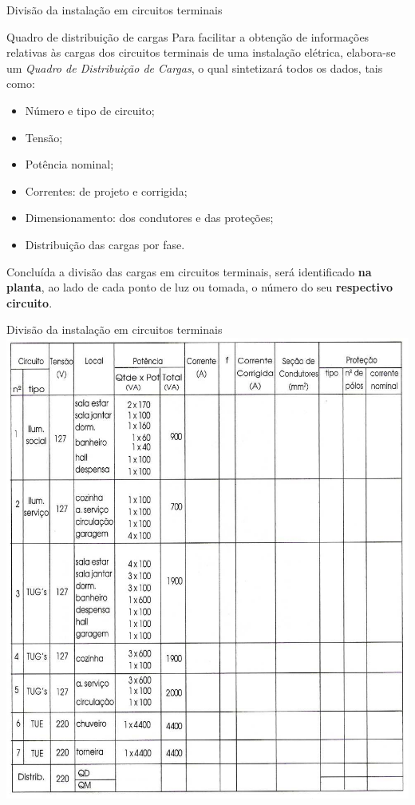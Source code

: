 \begin{frame}{Divisão da instalação em circuitos terminais}
	\begin{block}{Quadro de distribuição de cargas}
		Para facilitar a obtenção de informações relativas às cargas dos circuitos terminais de uma instalação elétrica, elabora-se um \textit{Quadro de Distribuição de Cargas}, o qual sintetizará todos os dados, tais como:
		\begin{itemize}
			\item Número e tipo de circuito;
			\item Tensão;
			\item Potência nominal;
			\item Correntes: de projeto e corrigida;
			\item Dimensionamento: dos condutores e das proteções;
			\item Distribuição das cargas por fase.
		\end{itemize}
		Concluída a divisão das cargas em circuitos terminais, será identificado \textbf{na planta}, ao lado de cada ponto de luz ou tomada, o número do seu \textbf{respectivo circuito}.
	\end{block}
\end{frame}


\begin{frame}{Divisão da instalação em circuitos terminais}
	\centering
	\includegraphics[width=0.55\linewidth]{Figuras/Ch05/fig16}
\end{frame}


